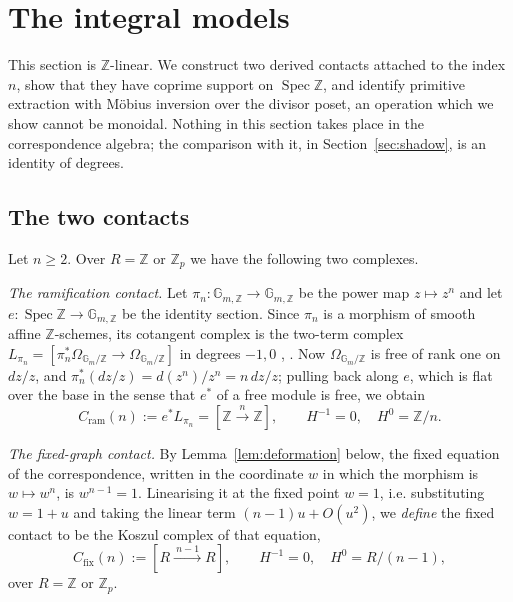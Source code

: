 \documentclass[11pt]{amsart}
\theoremstyle{definition}
\theoremstyle{remark}
\newcommand{\Z}{\mathbb Z}
\newcommand{\Spec}{\operatorname{Spec}}
\begin{document}
\section{The integral models}\label{sec:integral}

This section is $\Z$-linear.  We construct two derived contacts attached to
the index $n$, show that they have coprime support on $\Spec\Z$, and identify
primitive extraction with M\"obius inversion over the divisor poset, an
operation which we show cannot be monoidal.  Nothing in this section takes
place in the correspondence algebra; the comparison with it, in
Section~\ref{sec:shadow}, is an identity of degrees.

\subsection{The two contacts}

Let $n\ge2$. Over $R=\Z$ or $\Z_p$ we have the following two complexes.

\emph{The ramification contact.} Let $\pi_n:\mathbb G_{m,\Z}\to
\mathbb G_{m,\Z}$ be the power map $z\mapsto z^n$ and let
$e:\Spec\Z\to\mathbb G_{m,\Z}$ be the identity section. Since $\pi_n$ is a
morphism of smooth affine $\Z$-schemes, its cotangent complex is the two-term
complex $L_{\pi_n}=[\pi_n^*\Omega_{\mathbb G_m/\Z}\to\Omega_{\mathbb G_m/\Z}]$
in degrees $-1,0$ \cite[II.1.2]{Illusie}, \cite[Tag 08UQ]{Stacks}. Now
$\Omega_{\mathbb G_m/\Z}$ is free of rank one on $dz/z$, and
$\pi_n^*(dz/z)=d(z^n)/z^n=n\,dz/z$; pulling back along $e$, which is flat over
the base in the sense that $e^*$ of a free module is free, we obtain
\begin{equation}\label{eq:cram}
  C_{\mathrm{ram}}(n):=e^*L_{\pi_n}=[\Z\xrightarrow{\ n\ }\Z],\qquad
  H^{-1}=0,\quad H^0=\Z/n .
\end{equation}

\emph{The fixed-graph contact.} By Lemma~\ref{lem:deformation} below, the fixed
equation of the correspondence, written in the coordinate $w$ in which the
morphism is $w\mapsto w^n$, is $w^{n-1}=1$. Linearising it at the fixed point
$w=1$, i.e. substituting $w=1+u$ and taking the linear term
$(n-1)u+O(u^2)$, we \emph{define} the fixed contact to be the Koszul complex
of that equation,
\begin{equation}\label{eq:cfix}
  C_{\mathrm{fix}}(n):=[R\xrightarrow{\ n-1\ }R],\qquad
  H^{-1}=0,\quad H^0=R/(n-1),
\end{equation}
over $R=\Z$ or $\Z_p$.
\end{document}
